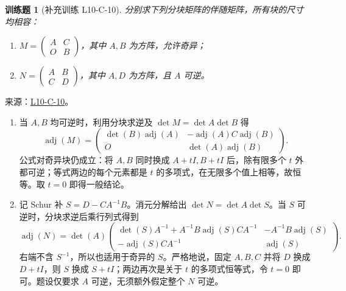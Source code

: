 \documentclass[UTF8,12pt,a4paper,fontset=fandol]{ctexart}
\newtheorem{exercise}{训练题}[section]
\begin{document}
\begin{exercise}[补充训练 L10-C-10]\label{prob:L10-C-10}
分别求下列分块矩阵的伴随矩阵，所有块的尺寸均相容：
\begin{enumerate}
\item $M=\begin{pmatrix}A&C\\O&B\end{pmatrix}$，其中 $A,B$ 为方阵，允许奇异；
\item $N=\begin{pmatrix}A&B\\C&D\end{pmatrix}$，其中 $A,D$ 为方阵，且 $A$ 可逆。
\end{enumerate}
\end{exercise}
\noindent 来源：\href{https://github.com/yhwu-is/Linear-Algebra-Left-Undone/blob/new/%E8%AE%B2%E4%B9%89/%E4%B8%93%E9%A2%98/10%20%E8%A1%8C%E5%88%97%E5%BC%8F.tex}{L10-C-10}。
\begin{solve}
\begin{enumerate}
\item 当 $A,B$ 均可逆时，利用分块求逆及 $\det M=\det A\det B$ 得
\[\operatorname{adj}(M)=\begin{pmatrix}\det(B)\operatorname{adj}(A)&-\operatorname{adj}(A)C\operatorname{adj}(B)\\O&\det(A)\operatorname{adj}(B)\end{pmatrix}.\]
公式对奇异块仍成立：将 $A,B$ 同时换成 $A+tI,B+tI$ 后，除有限多个 $t$ 外都可逆；等式两边的每个元素都是 $t$ 的多项式，在无限多个值上相等，故恒等。取 $t=0$ 即得一般结论。
\item 记 Schur 补 $S=D-CA^{-1}B$。消元分解给出 $\det N=\det A\det S$。当 $S$ 可逆时，分块求逆后乘行列式得到
\[\operatorname{adj}(N)=\det(A)\begin{pmatrix}
\det(S)A^{-1}+A^{-1}B\operatorname{adj}(S)CA^{-1}&-A^{-1}B\operatorname{adj}(S)\\
-\operatorname{adj}(S)CA^{-1}&\operatorname{adj}(S)
\end{pmatrix}.\]
右端不含 $S^{-1}$，所以也适用于奇异的 $S$。严格地说，固定 $A,B,C$ 并将 $D$ 换成 $D+tI$，则 $S$ 换成 $S+tI$；两边再次是关于 $t$ 的多项式恒等式，令 $t=0$ 即可。题设仅要求 $A$ 可逆，无须额外假定整个 $N$ 可逆。
\end{enumerate}
\end{solve}
\end{document}
